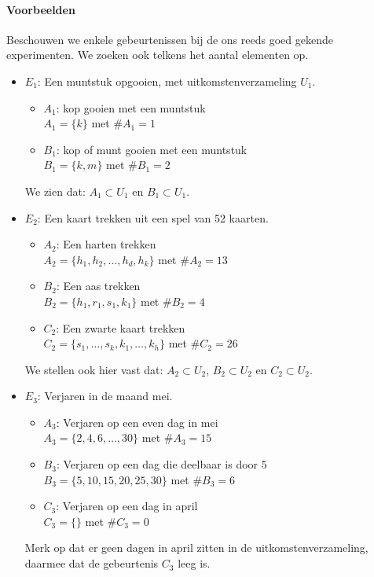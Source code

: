 \documentclass[12pt,twoside]{article}
\begin{document}
\paragraph*{Voorbeelden} Beschouwen we enkele gebeurtenissen bij de ons reeds goed gekende experimenten.
We zoeken ook telkens het aantal elementen op.
\begin{itemize}
  \item $E_1$: Een muntstuk opgooien, met uitkomstenverzameling $U_1$.
  \begin{itemize}
    \item $A_1$: kop gooien met een muntstuk\\
    $A_1=\{k\}$ met $\#A_1=1$
    \item $B_1$: kop of munt gooien met een muntstuk\\
    $B_1=\{k, m\}$ met $\#B_1=2$
  \end{itemize}
  We zien dat: $A_1\subset U_1$ en $B_1\subset U_1$.
  \item $E_2$: Een kaart trekken uit een spel van 52 kaarten.
  \begin{itemize}
    \item $A_2$: Een harten trekken\\
    $A_2=\{h_1, h_2, \ldots, h_d, h_k\}$ met $\#A_2=13$
    \item $B_2$: Een aas trekken\\
    $B_2=\{h_1, r_1, s_1, k_1\}$ met $\#B_2=4$
    \item $C_2$: Een zwarte kaart trekken\\
    $C_2=\{s_1, \ldots, s_k, k_1, \ldots, k_h\}$ met $\#C_2=26$
  \end{itemize}
  We stellen ook hier vast dat: $A_2\subset U_2$, $B_2\subset U_2$ en $C_2\subset U_2$.
  \item $E_3$: Verjaren in de maand mei.
  \begin{itemize}
    \item $A_3$: Verjaren op een even dag in mei\\
    $A_3=\{2,4,6,\ldots,30\}$ met $\#A_3=15$
    \item $B_3$: Verjaren op een dag die deelbaar is door 5\\
    $B_3=\{5,10,15,20,25,30\}$ met $\#B_3=6$
    \item $C_3$: Verjaren op een dag in april\\
    $C_3=\{\}$ met $\#C_3=0$
  \end{itemize}
  Merk op dat er geen dagen in april zitten in de uitkomstenverzameling, daarmee dat de gebeurtenis $C_3$ leeg is.
\end{itemize}
\end{document}
